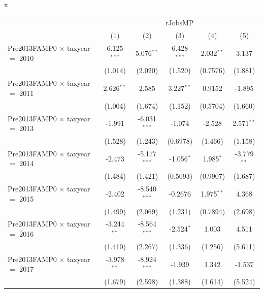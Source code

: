 x
\begingroup
\centering
\begin{tabular}{lccccc}
   \toprule
    & \multicolumn{5}{c}{rJobsMP}\\
                                           & (1)            & (2)            & (3)           & (4)           & (5)\\  
   \midrule 
   Pre2013FAMP0 $\times$ taxyear $=$ 2010  & 6.125$^{***}$  & 5.076$^{**}$   & 6.428$^{***}$ & 2.032$^{**}$  & 3.137\\   
                                           & (1.014)        & (2.020)        & (1.520)       & (0.7576)      & (1.881)\\   
   Pre2013FAMP0 $\times$ taxyear $=$ 2011  & 2.626$^{**}$   & 2.585          & 3.227$^{**}$  & 0.9152        & -1.895\\   
                                           & (1.004)        & (1.674)        & (1.152)       & (0.5704)      & (1.660)\\   
   Pre2013FAMP0 $\times$ taxyear $=$ 2013  & -1.991         & -6.031$^{***}$ & -1.074        & -2.528        & 2.571$^{**}$\\   
                                           & (1.528)        & (1.243)        & (0.6978)      & (1.466)       & (1.158)\\   
   Pre2013FAMP0 $\times$ taxyear $=$ 2014  & -2.473         & -5.177$^{***}$ & -1.056$^{*}$  & 1.985$^{*}$   & -3.779$^{**}$\\   
                                           & (1.484)        & (1.421)        & (0.5093)      & (0.9907)      & (1.687)\\   
   Pre2013FAMP0 $\times$ taxyear $=$ 2015  & -2.402         & -8.540$^{***}$ & -0.2676       & 1.975$^{**}$  & 4.368\\   
                                           & (1.499)        & (2.069)        & (1.231)       & (0.7894)      & (2.698)\\   
   Pre2013FAMP0 $\times$ taxyear $=$ 2016  & -3.244$^{**}$  & -8.564$^{***}$ & -2.524$^{*}$  & 1.003         & 4.511\\   
                                           & (1.410)        & (2.267)        & (1.336)       & (1.256)       & (5.611)\\   
   Pre2013FAMP0 $\times$ taxyear $=$ 2017  & -3.978$^{**}$  & -8.924$^{***}$ & -1.939        & 1.342         & -1.537\\   
                                           & (1.679)        & (2.598)        & (1.388)       & (1.614)       & (5.524)\\   

\end{tabular}
